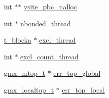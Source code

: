 \begin{DoxyCompactItemize}
\item 
int $\ast$$\ast$ \hyperlink{structgmx__reverse__top_aa499301b310f18446d4159d2b8b03fd7}{vsite\-\_\-pbc\-\_\-nalloc}
\item 
int $\ast$ \hyperlink{structgmx__reverse__top_afb6108a1a6bb3f7c9f14c1ae759a27db}{nbonded\-\_\-thread}
\item 
\hyperlink{structt__blocka}{t\-\_\-blocka} $\ast$ \hyperlink{structgmx__reverse__top_a13d1bad69daabe57343c76c2b3d86aab}{excl\-\_\-thread}
\item 
int $\ast$ \hyperlink{structgmx__reverse__top_a50a0435244a738fe9fadd7717db2bcc1}{excl\-\_\-count\-\_\-thread}
\item 
\hyperlink{structgmx__mtop__t}{gmx\-\_\-mtop\-\_\-t} $\ast$ \hyperlink{structgmx__reverse__top_a2e0101e0b7ac1c5f6fe0d654ac3be534}{err\-\_\-top\-\_\-global}
\item 
\hyperlink{structgmx__localtop__t}{gmx\-\_\-localtop\-\_\-t} $\ast$ \hyperlink{structgmx__reverse__top_ac49d741f1736f76f02d565c3d35e49a7}{err\-\_\-top\-\_\-local}
\end{DoxyCompactItemize}


